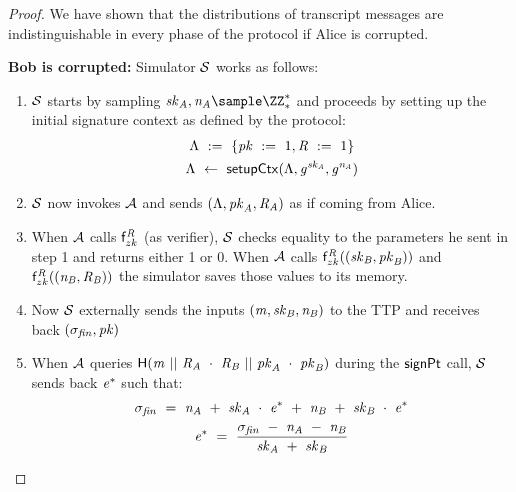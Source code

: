 \begin{proof}
    We have shown that the distributions of transcript messages are indistinguishable in every phase of the protocol if Alice is corrupted.

    \textbf{Bob is corrupted: } Simulator $\mathcal{S}$ works as follows:
    \begin{enumerate}
        \item $\mathcal{S}$ starts by sampling $\varSecKeyAlice, \varNonceAlice \sample \cnstIntegersPrimeWithoutZero{*}$ and proceeds by setting up the initial signature context as defined by the protocol:
        \begin{gather*}
            \Lambda ~:=~ \{ \mathit{pk} ~:=~ 1, \mathit{R} ~:=~ 1 \} \\
            \Lambda ~\leftarrow~ \mathsf{setupCtx}( \Lambda, \mathit{g}^{\mathit{sk}_{\mathit{A}}}, \mathit{g}^{\mathit{\mathit{n}_{\mathit{A}}}} ) \\
        \end{gather*}
        \item $\mathcal{S}$ now invokes $\mathcal{A}$ and sends $(\Lambda, \mathit{pk}_{\mathit{A}}, \mathit{R}_{\mathit{A}})$ as if coming from Alice.
        \item When $\mathcal{A}$ calls $\mathsf{f}^{\mathit{R}}_{zk}$ (as verifier), $\mathcal{S}$ checks equality to the parameters he sent in step 1 and returns either 1 or 0.
        When $\mathcal{A}$ calls $\mathsf{f}^{\mathit{R}}_{zk}((\mathit{sk}_{\mathit{B}}, \mathit{pk}_{\mathit{B}}))$ and $\mathsf{f}^{\mathit{R}}_{zk}((\mathit{\mathit{n}_{\mathit{B}}}, \mathit{R}_{\mathit{B}}))$ the simulator saves those values to its memory.
        \item Now $\mathcal{S}$ externally sends the inputs $(\mathit{m}, \mathit{sk}_{\mathit{B}}, \mathit{\mathit{n}_{\mathit{B}}})$ to the TTP and receives back $(\sigma_{\mathit{fin}}, \mathit{pk})$
        \item When $\mathcal{A}$ queries $\mathsf{H} (\mathit{m} ~||~ \mathit{R}_{\mathit{A}} ~\cdot~ \mathit{R}_{\mathit{B}} ~||~ \mathit{pk}_{\mathit{A}} ~\cdot~ \mathit{pk}_{\mathit{B}})$ during the $\mathsf{signPt}$ call, $\mathcal{S}$ sends back $\mathit{e}^*$ such that:
        \begin{gather*}
            \sigma_{\mathit{fin}} ~=~ \mathit{\mathit{n}_{\mathit{A}}} ~+~ \mathit{sk}_{\mathit{A}} ~\cdot~ \mathit{e}^* ~+~ \mathit{\mathit{n}_{\mathit{B}}} ~+~ \mathit{sk}_{\mathit{B}} ~\cdot~ \mathit{e}^* \\
            \mathit{e}^* ~=~ \frac{\sigma_{\mathit{fin}} ~-~ \mathit{\mathit{n}_{\mathit{A}}} ~-~ \mathit{\mathit{n}_{\mathit{B}}}}{\mathit{sk}_{\mathit{A}} ~+~ \mathit{sk}_{\mathit{B}}}
        \end{gather*}

\end{enumerate}
\end{proof}
